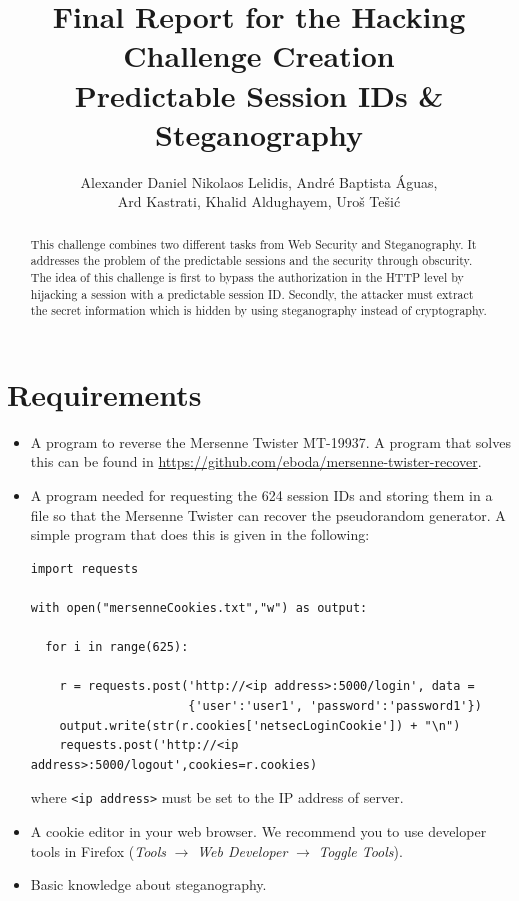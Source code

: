 \documentclass[11pt]{article}
\title{\vspace{-1.7cm}Final Report for the Hacking Challenge Creation
\\[0.3in]
\bfseries Predictable Session IDs \& Steganography
\\[0.1in]
}
\author{Alexander Daniel Nikolaos Lelidis, Andr\'{e} Baptista \'{A}guas, \\ Ard Kastrati, Khalid Aldughayem, Uro\v{s} Te\v{s}i\'{c}}
\begin{document}
\maketitle

\begin{abstract}
This challenge combines two different tasks from Web Security and Steganography. It addresses the problem of the predictable sessions and the security through obscurity. The idea of this challenge is first to bypass the authorization in the HTTP level by hijacking a session with a predictable session ID. Secondly, the attacker must extract the secret information which is hidden by using steganography instead of cryptography. 
\end{abstract}


\section{Requirements}

\begin{itemize}
\item A program to reverse the Mersenne Twister MT-19937. A program that solves this can be found in \url{https://github.com/eboda/mersenne-twister-recover}.
\item A program needed for requesting the 624 session IDs and storing them in a file so that the Mersenne Twister can recover the pseudorandom generator. A simple program that does this is given in the following:
\begin{verbatim}
import requests

with open("mersenneCookies.txt","w") as output:

  for i in range(625):
  
    r = requests.post('http://<ip address>:5000/login', data = 
                      {'user':'user1', 'password':'password1'})
    output.write(str(r.cookies['netsecLoginCookie']) + "\n")
    requests.post('http://<ip address>:5000/logout',cookies=r.cookies)
\end{verbatim}
where \texttt{<ip address>} must be set to the IP address of server. 
\item A cookie editor in your web browser. We recommend you to use developer tools in Firefox (\textit{Tools} $\rightarrow$ \textit{Web Developer} $\rightarrow$ \textit{Toggle Tools}).
\item Basic knowledge about steganography.
\end{itemize}
\end{document}
